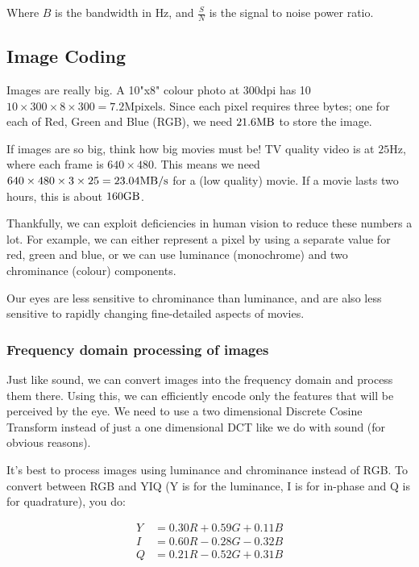 Where $B$ is the bandwidth in $\si{\hertz}$, and $\frac{S}{N}$ is the signal to
noise power ratio.

\subsection{Image Coding}

Images are really big. A 10"x8" colour photo at 300dpi has 10
$10\times300\times8\times300 = 7.2\text{Mpixels}$. Since each pixel requires
three bytes; one for each of Red, Green and Blue (RGB), we need
$21.6\si{\mega\byte}$ to store the image.

If images are so big, think how big movies must be! TV quality video is at
$25\si{\hertz}$, where each frame is $640\times480$. This means we need $640
\times 480 \times 3 \times 25=23.04\si{\mega\byte\per\second}$ for a (low
quality) movie. If a movie lasts two hours, this is about $160\si{\giga\byte}$.

Thankfully, we can exploit deficiencies in human vision to reduce these numbers
a lot. For example, we can either represent a pixel by using a separate value
for red, green and blue, or we can use luminance (monochrome) and two
chrominance (colour) components.

Our eyes are less sensitive to chrominance than luminance, and are also less
sensitive to rapidly changing fine-detailed aspects of movies.

\subsubsection{Frequency domain processing of images}

Just like sound, we can convert images into the frequency domain and process
them there. Using this, we can efficiently encode only the features that will be
perceived by the eye. We need to use a two dimensional Discrete Cosine Transform
instead of just a one dimensional DCT like we do with sound (for obvious
reasons).

It's best to process images using luminance and chrominance instead of RGB. To
convert between RGB and YIQ (Y is for the luminance, I is for in-phase and Q is
for quadrature), you do:


\[
  \begin{split}
    Y &= 0.30R + 0.59G + 0.11B\\
    I &= 0.60R - 0.28G - 0.32B\\
    Q &= 0.21R - 0.52G + 0.31B\\
  \end{split} 
\]

